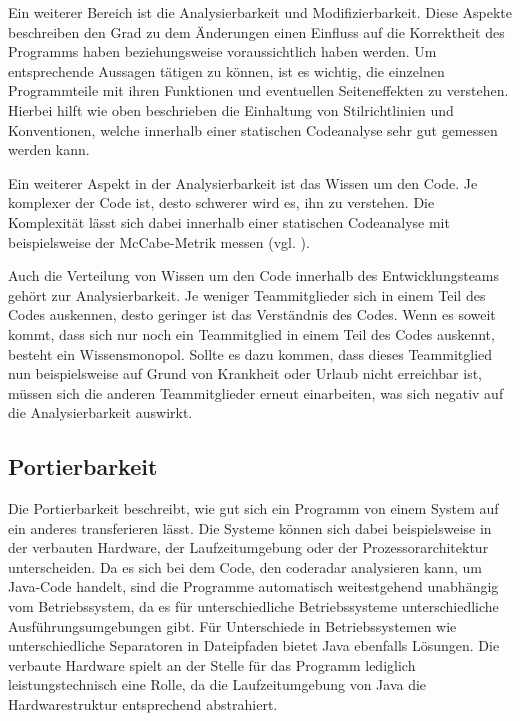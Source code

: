 \documentclass[
	oneside,  %
	ngerman, 
	final, 
	11pt, 
	a4paper, 
	1.1headlines, 
	headinclude=false, 
	footinclude=false, 
	mpinclude=false, 
	pagesize, 
	onecolumn, 
	titlepage, 
	parskip=half, 
	headsepline, 
	chapterprefix=false, 
	version=first, 
	listof=totoc, 
	bibliography=totoc, 
	toc=graduated, 
	fleqn
]{scrbook}
\begin{document}
Ein weiterer Bereich ist die Analysierbarkeit und Modifizierbarkeit.
Diese Aspekte beschreiben den Grad zu dem Änderungen einen Einfluss auf die Korrektheit des Programms haben beziehungsweise voraussichtlich haben werden.
Um entsprechende Aussagen tätigen zu können, ist es wichtig, die einzelnen Programmteile mit ihren Funktionen und eventuellen Seiteneffekten zu verstehen.
Hierbei hilft wie oben beschrieben die Einhaltung von Stilrichtlinien und Konventionen, welche innerhalb einer statischen Codeanalyse sehr gut gemessen werden kann.

Ein weiterer Aspekt in der Analysierbarkeit ist das Wissen um den Code.
Je komplexer der Code ist, desto schwerer wird es, ihn zu verstehen.
Die Komplexität lässt sich dabei innerhalb einer statischen Codeanalyse mit beispielsweise der McCabe-Metrik messen (vgl. \cite{MC1976}).

Auch die Verteilung von Wissen um den Code innerhalb des Entwicklungsteams gehört zur Analysierbarkeit.
Je weniger Teammitglieder sich in einem Teil des Codes auskennen, desto geringer ist das Verständnis des Codes.
Wenn es soweit kommt, dass sich nur noch ein Teammitglied in einem Teil des Codes auskennt, besteht ein Wissensmonopol.
Sollte es dazu kommen, dass dieses Teammitglied nun beispielsweise auf Grund von Krankheit oder Urlaub nicht erreichbar ist, müssen sich die anderen Teammitglieder erneut einarbeiten, was sich negativ auf die Analysierbarkeit auswirkt.

\subsection{Portierbarkeit}
Die Portierbarkeit beschreibt, wie gut sich ein Programm von einem System auf ein anderes transferieren lässt.
Die Systeme können sich dabei beispielsweise in der verbauten Hardware, der Laufzeitumgebung oder der Prozessorarchitektur unterscheiden.
Da es sich bei dem Code, den coderadar analysieren kann, um Java-Code handelt, sind die Programme automatisch weitestgehend unabhängig vom Betriebssystem, da es für unterschiedliche Betriebssysteme unterschiedliche Ausführungsumgebungen gibt.
Für Unterschiede in Betriebssystemen wie unterschiedliche Separatoren in Dateipfaden bietet Java ebenfalls Lösungen.
Die verbaute Hardware spielt an der Stelle für das Programm lediglich leistungstechnisch eine Rolle, da die Laufzeitumgebung von Java die Hardwarestruktur entsprechend abstrahiert.
\end{document}
